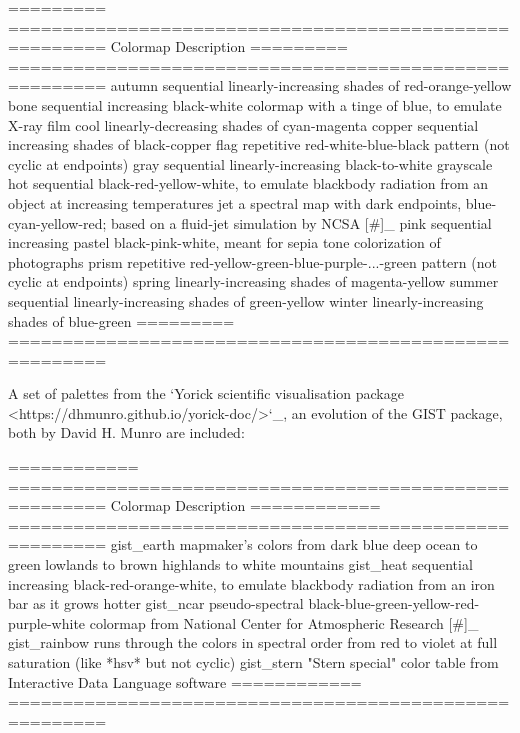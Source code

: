 \begin{DoxyVerb}
  =========   =======================================================
  Colormap    Description
  =========   =======================================================
  autumn      sequential linearly-increasing shades of red-orange-yellow
  bone        sequential increasing black-white colormap with
              a tinge of blue, to emulate X-ray film
  cool        linearly-decreasing shades of cyan-magenta
  copper      sequential increasing shades of black-copper
  flag        repetitive red-white-blue-black pattern (not cyclic at
              endpoints)
  gray        sequential linearly-increasing black-to-white
              grayscale
  hot         sequential black-red-yellow-white, to emulate blackbody
              radiation from an object at increasing temperatures
  jet         a spectral map with dark endpoints, blue-cyan-yellow-red;
              based on a fluid-jet simulation by NCSA [#]_
  pink        sequential increasing pastel black-pink-white, meant
              for sepia tone colorization of photographs
  prism       repetitive red-yellow-green-blue-purple-...-green pattern
              (not cyclic at endpoints)
  spring      linearly-increasing shades of magenta-yellow
  summer      sequential linearly-increasing shades of green-yellow
  winter      linearly-increasing shades of blue-green
  =========   =======================================================

A set of palettes from the `Yorick scientific visualisation
package <https://dhmunro.github.io/yorick-doc/>`_, an evolution of
the GIST package, both by David H. Munro are included:

  ============  =======================================================
  Colormap      Description
  ============  =======================================================
  gist_earth    mapmaker's colors from dark blue deep ocean to green
                lowlands to brown highlands to white mountains
  gist_heat     sequential increasing black-red-orange-white, to emulate
                blackbody radiation from an iron bar as it grows hotter
  gist_ncar     pseudo-spectral black-blue-green-yellow-red-purple-white
                colormap from National Center for Atmospheric
                Research [#]_
  gist_rainbow  runs through the colors in spectral order from red to
                violet at full saturation (like *hsv* but not cyclic)
  gist_stern    "Stern special" color table from Interactive Data
                Language software
  ============  =======================================================


\end{DoxyVerb}
